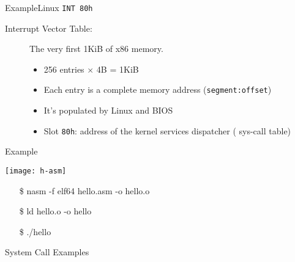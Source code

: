 \begin{frame}{Example}{Linux \texttt{INT 80h}}
  \begin{description}
  \item[Interrupt Vector Table:] The very first 1KiB of x86 memory. 
    \begin{itemize} 
    \item 256 entries $\times$ 4B = 1KiB
    \item Each entry is a complete memory address (\texttt{segment:offset})
    \item It's populated by Linux and BIOS
    \item Slot \texttt{80h}: address of the kernel services dispatcher ({\pright} sys-call table)
    \end{itemize}
  \end{description}
\end{frame}

\begin{frame}{Example}
  \begin{center}
    \texttt{[image: h-asm]}
  \end{center}
  \begin{block}{}
    \ttfamily
    \begin{enumerate}
    \item[\$] nasm -f elf64 hello.asm -o hello.o
    \item[\$] ld hello.o -o hello
    \item[\$] ./hello
    \end{enumerate}
  \end{block}
\end{frame}

\begin{frame}%
  \begin{center}
  \end{center}
\end{frame}

\begin{frame}{System Call Examples}
  \begin{block}{}
    \begin{center}
    \end{center}
  \end{block}
  \qquad{}
\end{frame}

